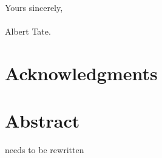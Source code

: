 \documentclass[12pt,openany,a4paper]{book}
\begin{document}
\begin{flushright}
	Yours sincerely,\\
	\medskip
	\makebox[1.0in]{\hrulefill}\\
	\medskip
	Albert Tate.
\end{flushright}

\cleardoublepage

\chapter{Acknowledgments}


\cleardoublepage

\chapter{Abstract}

needs to be rewritten\\
\end{document}
